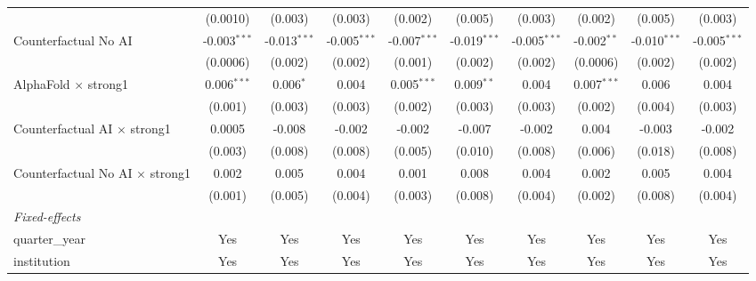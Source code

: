 \begin{tabular}{lccccccccc}
                                          & (0.0010)       & (0.003)        & (0.003)        & (0.002)        & (0.005)        & (0.003)        & (0.002)       & (0.005)        & (0.003)\\   
   Counterfactual No AI                   & -0.003$^{***}$ & -0.013$^{***}$ & -0.005$^{***}$ & -0.007$^{***}$ & -0.019$^{***}$ & -0.005$^{***}$ & -0.002$^{**}$ & -0.010$^{***}$ & -0.005$^{***}$\\   
                                          & (0.0006)       & (0.002)        & (0.002)        & (0.001)        & (0.002)        & (0.002)        & (0.0006)      & (0.002)        & (0.002)\\   
   AlphaFold $\times$ strong1             & 0.006$^{***}$  & 0.006$^{*}$    & 0.004          & 0.005$^{***}$  & 0.009$^{**}$   & 0.004          & 0.007$^{***}$ & 0.006          & 0.004\\   
                                          & (0.001)        & (0.003)        & (0.003)        & (0.002)        & (0.003)        & (0.003)        & (0.002)       & (0.004)        & (0.003)\\   
   Counterfactual AI $\times$ strong1     & 0.0005         & -0.008         & -0.002         & -0.002         & -0.007         & -0.002         & 0.004         & -0.003         & -0.002\\   
                                          & (0.003)        & (0.008)        & (0.008)        & (0.005)        & (0.010)        & (0.008)        & (0.006)       & (0.018)        & (0.008)\\   
   Counterfactual No AI $\times$ strong1  & 0.002          & 0.005          & 0.004          & 0.001          & 0.008          & 0.004          & 0.002         & 0.005          & 0.004\\   
                                          & (0.001)        & (0.005)        & (0.004)        & (0.003)        & (0.008)        & (0.004)        & (0.002)       & (0.008)        & (0.004)\\   
   \midrule
   \emph{Fixed-effects}\\
   quarter\_year                          & Yes            & Yes            & Yes            & Yes            & Yes            & Yes            & Yes           & Yes            & Yes\\  
   institution                            & Yes            & Yes            & Yes            & Yes            & Yes            & Yes            & Yes           & Yes            & Yes\\  

\end{tabular}
